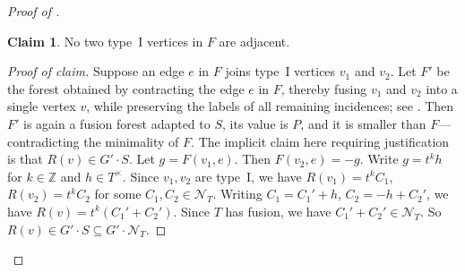 \documentclass[reqno]{amsart}
\theoremstyle{definition}
\newtheorem{Claim}{Claim}
\theoremstyle{remark}
\newcommand{\Nc}{\mathcal{N}}
\begin{document}
\begin{proof}[Proof of ]
        \begin{Claim}\label{claim:nadjacent}
        No two type~I vertices in $F$ are adjacent. 
        \end{Claim}
        \begin{proof}[Proof of claim]
        Suppose an edge $e$ in $F$ joins type~I vertices $v_1$ and $v_2$.
        Let $F'$ be the forest obtained by contracting the edge $e$ in $F$, thereby fusing $v_1$ and $v_2$ into a single vertex $v$,
        while preserving the labels of all remaining incidences; see . Then $F'$ is again a fusion forest adapted to $S$, its value is $P$, and it is smaller than $F$---contradicting the minimality of $F$. 
        The implicit claim here requiring justification is
        that $R(v) \in G' \cdot S$.
        Let $g = F(v_1, e)$. Then 
        $F(v_2, e) = -g$. 
         Write
        $g = t^k h$ for $k \in \mathbb{Z}$ and 
        $h \in T^{\times}$.
        Since $v_1, v_2$ are type~I, we have 
        $R(v_1) = t^k C_1$, 
        $R(v_2) = t^k C_2$ for some 
        $C_1, C_2 \in \Nc_T$.
        Writing $C_1 = C_1' + h$, 
        $C_2 = -h + C_2'$, we have 
        $R(v) = t^{k}(C_1' + C_2')$. Since $T$ has fusion, we have $C_1' + C_2' \in \Nc_T$. 
        So $R(v) \in G' \cdot S \subseteq G' \cdot \Nc_T$.
        \end{proof}
\begin{figure}[ht]
    \centering
\end{figure}
\end{proof}
\end{document}
